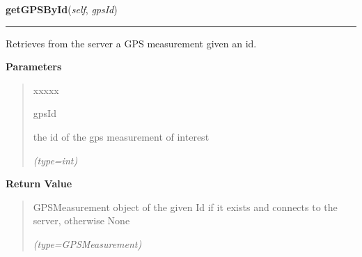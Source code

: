 \hspace{.8\funcindent}\begin{boxedminipage}{\funcwidth}

    \raggedright \textbf{getGPSById}(\textit{self}, \textit{gpsId})

    \vspace{-1.5ex}

    \rule{\textwidth}{0.5\fboxrule}
\setlength{\parskip}{2ex}
    Retrieves from the server a GPS measurement given an id.

\setlength{\parskip}{1ex}
      \textbf{Parameters}
      \vspace{-1ex}

      \begin{quote}
        \begin{Ventry}{xxxxx}

          \item[gpsId]

          the id of the gps measurement of interest

            {\it (type=int)}

        \end{Ventry}

      \end{quote}

      \textbf{Return Value}
    \vspace{-1ex}

      \begin{quote}
      GPSMeasurement object of the given Id if it exists and connects to 
      the server, otherwise None

      {\it (type=GPSMeasurement)}

      \end{quote}

    \end{boxedminipage}

    \label{client_rest:ImagingInterface:getStateByTs}

    \vspace{0.5ex}

